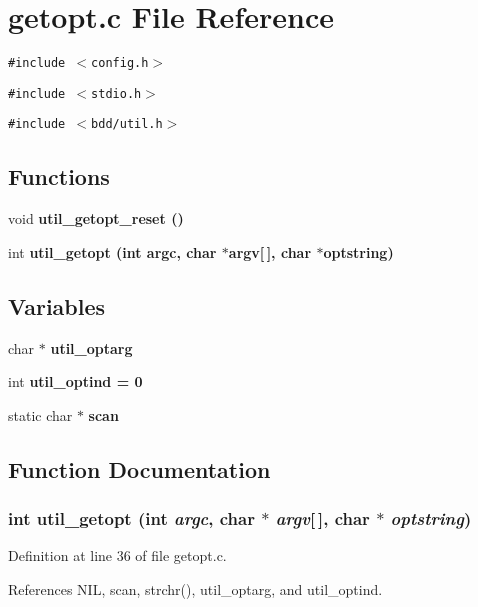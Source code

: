 \section{getopt.c File Reference}
\label{getopt_8c}
{\tt \#include $<$config.h$>$}\par
{\tt \#include $<$stdio.h$>$}\par
{\tt \#include $<$bdd/util.h$>$}\par
\subsection*{Functions}
\begin{CompactItemize}
\item 
void \bf{util\_\-getopt\_\-reset} ()
\item 
int \bf{util\_\-getopt} (int argc, char $\ast$argv[$\,$], char $\ast$optstring)
\end{CompactItemize}
\subsection*{Variables}
\begin{CompactItemize}
\item 
char $\ast$ \bf{util\_\-optarg}
\item 
int \bf{util\_\-optind} = 0
\item 
static char $\ast$ \bf{scan}
\end{CompactItemize}


\subsection{Function Documentation}
\subsubsection{\setlength{\rightskip}{0pt plus 5cm}int util\_\-getopt (int {\em argc}, char $\ast$ {\em argv}[$\,$], char $\ast$ {\em optstring})}\label{getopt_8c_2d780c38fc80f94cbbfa359aeb11e029}




Definition at line 36 of file getopt.c.

References NIL, scan, strchr(), util\_\-optarg, and util\_\-optind.
